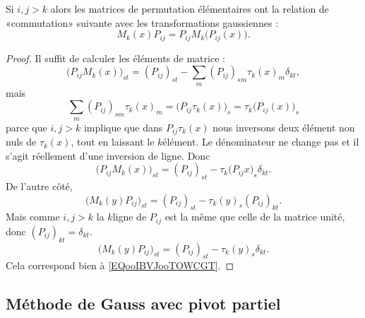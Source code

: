 \begin{lemma}        \label{LEMooYIYIooYhnaOt}
    Si \( i,j>k\) alors les matrices de permutation élémentaires ont la relation de «commutation» suivante avec les transformations gaussiennes :
    \begin{equation}
        M_k(x)P_{ij}=P_{ij}M_k\big(  P_{ij}(x) \big).
    \end{equation}
\end{lemma}

\begin{proof}
    Il suffit de calculer les éléments de matrice :
    \begin{equation}
        \big( P_{ij}M_k(x) \big)_{st}=(P_{ij})_{st}-\sum_m(P_{ij})_{sm}\tau_k(x)_{m}\delta_{kt},
    \end{equation}
    mais 
    \begin{equation}
        \sum_m(P_{ij})_{sm}\tau_k(x)_{m}=\big( P_{ij}\tau_k(x) \big)_s=\tau_k\big( P_{ij}(x) \big)_s
    \end{equation}
    parce que \( i,j>k\) implique que dans \( P_{ij}\tau_k(x)\) nous inversons deux élément non nuls de \( \tau_k(x)\), tout en laissant le \( k\)\ieme élément. Le dénominateur ne change pas et il s'agit réellement d'une inversion de ligne. Donc
    \begin{equation}        \label{EQooIBVJooTOWCGT}
        \big( P_{ij}M_k(x) \big)_{st}=(P_{ij})_{st}-\tau_k\big( P_{ij}x \big)_s\delta_{kt}.
    \end{equation}
    De l'autre côté,
    \begin{equation}
        \big( M_k(y)P_{ij} \big)_{st}=(P_{ij})_{st}-\tau_k(y)_s(P_{ij})_{kt}.
    \end{equation}
    Mais comme \( i,j>k\) la \( k\)\ieme ligne de \( P_{ij}\) est la même que celle de la matrice unité, donc \( (P_{ij})_{kt}=\delta_{kt}\).
    \begin{equation}
        \big( M_k(y)P_{ij} \big)_{st}=(P_{ij})_{st}-\tau_k(y)_s\delta_{kt}.
    \end{equation}
    Cela correspond bien à \eqref{EQooIBVJooTOWCGT}.
\end{proof}

\subsection{Méthode de Gauss avec pivot partiel}

